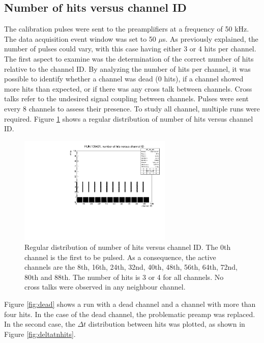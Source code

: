 \subsection{Number of hits versus channel ID}\label{nhitvschid}
The calibration pulses were sent to the preamplifiers at a frequency of 50 kHz. 
The data acquisition event window was set to 50 $\mu$s. 
As previously explained, the number of pulses could vary, with this case having either 3 or 4 hits per channel. 
The first aspect to examine was the determination of the correct number 
of hits relative to the channel ID. By analyzing the number of hits per channel, 
it was possible to identify whether a channel was dead (0 hits), if a channel showed more hits than expected, 
or if there was any cross talk between channels.
Cross talks refer to the undesired signal coupling between channels. 
Pulses were sent every 8 channels to assess their presence. To study all channel, multiple runs were required.
Figure \ref{fig:normalhits} shows a regular distribution of number of hits versus channel ID.
\begin{figure}[!h]
      \centering
      \includegraphics[width=0.65\textwidth]{figures/pdf/run105421_nh_vs_ch.pdf}
      \caption{Regular distribution of number of hits versus channel ID. The 0th channel is the first to be pulsed.
      As a consequence, the active channels are the 8th, 16th, 24th, 32nd, 40th, 48th, 56th, 64th, 72nd, 80th and 88th. The number of hits is 3 or 4 for all channels. 
      No cross talks were observed in any neighbour channel.}
     \label{fig:normalhits}
\end{figure}
Figure \ref{fig:dead} shows a run with a dead channel and a channel with more than four hits. 
In the case of the dead channel, the problematic preamp was replaced. In the second case, the 
$\Delta t$ distribution between hits was plotted, as shown in Figure \ref{fig:deltatnhits}.

